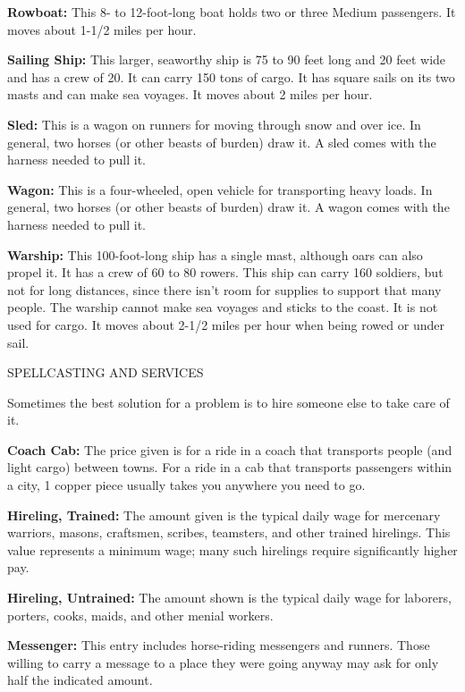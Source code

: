 \documentclass{article}
\begin{document}
\textbf{Rowboat: }This 8- to 12-foot-long boat holds two or three Medium passengers. 
It moves about 1-1/2 miles per hour.

\textbf{Sailing Ship:} This larger, seaworthy ship is 75 to 90 feet long and 20 
feet wide and has a crew of 20. It can carry 150 tons of cargo. It has square sails 
on its two masts and can make sea voyages. It moves about 2 miles per hour.

\textbf{Sled: }This is a wagon on runners for moving through snow and over ice. 
In general, two horses (or other beasts of burden) draw it. A sled comes with the 
harness needed to pull it.

\textbf{Wagon:} This is a four-wheeled, open vehicle for transporting heavy loads. 
In general, two horses (or other beasts of burden) draw it. A wagon comes with 
the harness needed to pull it.

\textbf{Warship: }This 100-foot-long ship has a single mast, although oars can 
also propel it. It has a crew of 60 to 80 rowers. This ship can carry 160 soldiers, 
but not for long distances, since there isn't room for supplies to support that 
many people. The warship cannot make sea voyages and sticks to the coast. It is 
not used for cargo. It moves about 2-1/2 miles per hour when being rowed or under 
sail.

\vspace{12pt}
SPELLCASTING AND SERVICES

Sometimes the best solution for a problem is to hire someone else to take care 
of it.

\textbf{Coach Cab:} The price given is for a ride in a coach that transports people 
(and light cargo) between towns. For a ride in a cab that transports passengers 
within a city, 1 copper piece usually takes you anywhere you need to go.

\textbf{Hireling, Trained:} The amount given is the typical daily wage for mercenary 
warriors, masons, craftsmen, scribes, teamsters, and other trained hirelings. This 
value represents a minimum wage; many such hirelings require significantly higher 
pay.

\textbf{Hireling, Untrained:} The amount shown is the typical daily wage for laborers, 
porters, cooks, maids, and other menial workers.

\textbf{Messenger:} This entry includes horse-riding messengers and runners. Those 
willing to carry a message to a place they were going anyway may ask for only half 
the indicated amount.
\end{document}

